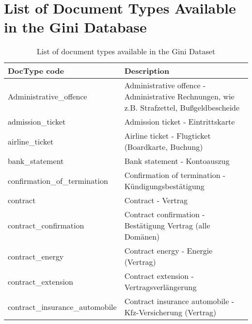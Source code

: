 \chapter{List of Document Types Available in the Gini Database}
\label{chapter:available_doc_types}

\begin{longtable}[h]{|l|p{9cm}|}
\caption[List of document types available in the Gini Dataset]{List of document types available in the Gini Dataset} \label{tab:list_gini_doctypes} \\
\hline DocType code & Description \\
\hline Administrative\_offence                  &  Administrative offence - Administrative Rechnungen, wie z.B. Strafzettel, Bu{\ss}geldbescheide      \\
 admission\_ticket                        &  Admission ticket -  Eintrittskarte                                                                \\
 airline\_ticket                          &  Airline ticket -  Flugticket (Boardkarte, Buchung)                                                \\
 bank\_statement                          &  Bank statement -  Kontoauszug                                                                     \\
 confirmation\_of\_termination            &  Confirmation of termination -  K\"{u}ndigungsbest\"{a}tigung                                  \\
 contract                                 &  Contract -  Vertrag                                                                               \\
 contract\_confirmation                   &  Contract  confirmation -  Best\"{a}tigung Vertrag (alle Dom\"{a}nen)                          \\
 contract\_energy                         &  Contract  energy  - Energie (Vertrag)                                                             \\
 contract\_extension                      &  Contract  extension -  Vertragsverl\"{a}ngerung                                                 \\
 contract\_insurance\_automobile          &  Contract insurance automobile -  Kfz-Versicherung (Vertrag)                                       \\

\end{longtable}

